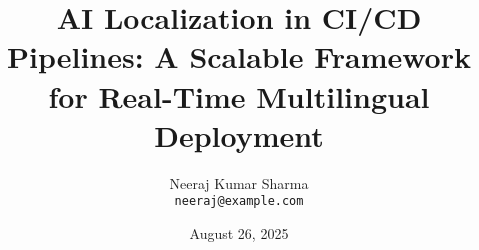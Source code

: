 \documentclass[11pt]{article}
\title{AI Localization in CI/CD Pipelines: A Scalable Framework for Real-Time Multilingual Deployment}
\author{
  Neeraj Kumar Sharma \\
  \texttt{neeraj@example.com}
}
\date{August 26, 2025}
\begin{document}
\maketitle










\ifx\venue\emnlp
  
\else
  
\fi

\end{document}
